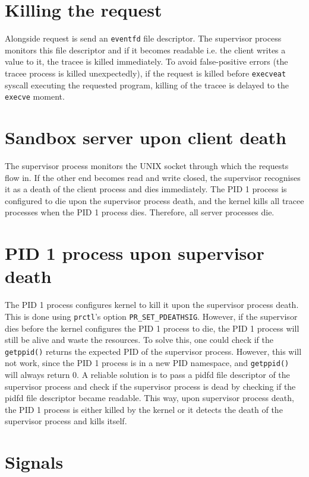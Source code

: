 \documentclass[en]{pracamgr}
\begin{document}
\section{Killing the request}

Alongside request is send an \texttt{eventfd} file descriptor. The supervisor process monitors this file descriptor and if it becomes readable i.e. the client writes a value to it, the tracee is killed immediately. To avoid false-positive errors (the tracee process is killed unexpectedly), if the request is killed before \texttt{execveat} syscall executing the requested program, killing of the tracee is delayed to the \texttt{execve} moment.

\section{Sandbox server upon client death}

The supervisor process monitors the UNIX socket through which the requests flow in. If the other end becomes read and write closed, the supervisor recognises it as a death of the client process and dies immediately. The PID 1 process is configured to die upon the supervisor process death, and the kernel kills all tracee processes when the PID 1 process dies. Therefore, all server processes die.

\section{PID 1 process upon supervisor death}

The PID 1 process configures kernel to kill it upon the supervisor process death. This is done using \texttt{prctl}'s option \texttt{PR\_SET\_PDEATHSIG}. However, if the supervisor dies before the kernel configures the PID 1 process to die, the PID 1 process will still be alive and waste the resources. To solve this, one could check if the \texttt{getppid()} returns the expected PID of the supervisor process. However, this will not work, since the PID 1 process is in a new PID namespace, and \texttt{getppid()} will always return 0. A reliable solution is to pass a pidfd file descriptor of the supervisor process and check if the supervisor process is dead by checking if the pidfd file descriptor became readable. This way, upon supervisor process death, the PID 1 process is either killed by the kernel or it detects the death of the supervisor process and kills itself.

\section{Signals}
\end{document}
